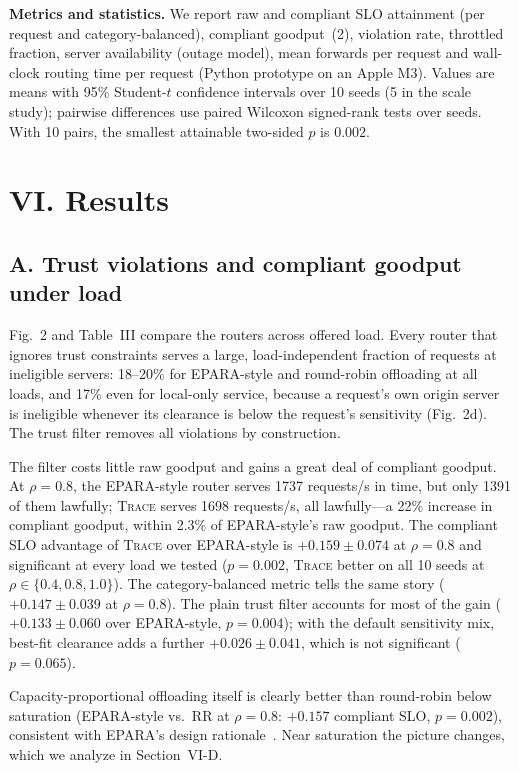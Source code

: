 \documentclass{article}
\newcommand{\sys}{\textsc{Trace}}
\begin{document}
\textbf{Metrics and statistics.} We report raw and compliant SLO attainment (per request and category-balanced), compliant goodput~(2), violation rate, throttled fraction, server availability (outage model), mean forwards per request and wall-clock routing time per request (Python prototype on an Apple M3). Values are means with 95\% Student-$t$ confidence intervals over 10 seeds (5 in the scale study); pairwise differences use paired Wilcoxon signed-rank tests over seeds. With 10 pairs, the smallest attainable two-sided $p$ is $0.002$.

\section*{VI. Results}

\subsection*{A. Trust violations and compliant goodput under load}

Fig.~2 and Table~III compare the routers across offered load. Every router that ignores trust constraints serves a large, load-independent fraction of requests at ineligible servers: 18--20\% for EPARA-style and round-robin offloading at all loads, and 17\% even for local-only service, because a request's own origin server is ineligible whenever its clearance is below the request's sensitivity (Fig.~2d). The trust filter removes all violations by construction.

The filter costs little raw goodput and gains a great deal of compliant goodput. At $\rho=0.8$, the EPARA-style router serves 1737 requests/s in time, but only 1391 of them lawfully; \sys{} serves 1698 requests/s, all lawfully---a 22\% increase in compliant goodput, within 2.3\% of EPARA-style's raw goodput. The compliant SLO advantage of \sys{} over EPARA-style is $+0.159\pm0.074$ at $\rho=0.8$ and significant at every load we tested ($p=0.002$, \sys{} better on all 10 seeds at $\rho\in\{0.4,0.8,1.0\}$). The category-balanced metric tells the same story ($+0.147\pm0.039$ at $\rho=0.8$). The plain trust filter accounts for most of the gain ($+0.133\pm0.060$ over EPARA-style, $p=0.004$); with the default sensitivity mix, best-fit clearance adds a further $+0.026\pm0.041$, which is not significant ($p=0.065$).

Capacity-proportional offloading itself is clearly better than round-robin below saturation (EPARA-style vs.\ RR at $\rho=0.8$: $+0.157$ compliant SLO, $p=0.002$), consistent with EPARA's design rationale~\cite{epara2025}. Near saturation the picture changes, which we analyze in Section~VI-D.
\end{document}
